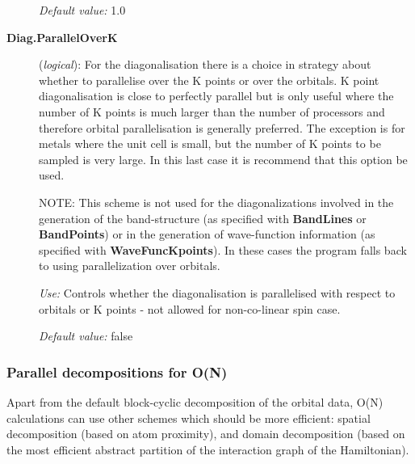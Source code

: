 \begin{description}
\textit{Default value:}  1.0

\item[\textbf{Diag.ParallelOverK}] (\textit{logical}):  For the diagonalisation there is a choice in strategy
about whether to parallelise over the K points or over the orbitals. K
point diagonalisation is close to perfectly parallel but is only
useful where the number of K points is much larger than the number of
processors and therefore orbital parallelisation is generally
preferred. The exception is for metals where the unit cell is small,
but the number of K points to be sampled is very large. In this last
case it is recommend that this option be used.

NOTE: This scheme is not used for the diagonalizations involved in the
generation of the band-structure (as specified with \textbf{BandLines} or
\textbf{BandPoints}) or in the generation of wave-function information
(as specified with \textbf{WaveFuncKpoints}). In these cases the program
falls back to using parallelization over orbitals.

\textit{Use:} Controls whether the diagonalisation is parallelised with
respect to orbitals or K points - not allowed for non-co-linear spin
case.

\textit{Default value:}  false

\end{description}

\subsubsection{Parallel decompositions for O(N)}
\label{parallel-on}

Apart from the default block-cyclic decomposition of the orbital data,
O(N) calculations can use other schemes which should be more
efficient: spatial decomposition (based on atom proximity), and domain
decomposition (based on the most efficient abstract partition of the
interaction graph of the Hamiltonian). 

